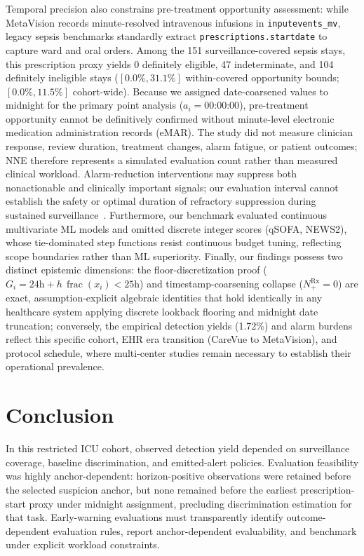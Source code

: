 \documentclass[12pt,a4paper]{article}
\begin{document}
Temporal precision also constrains pre-treatment opportunity assessment: while MetaVision records minute-resolved intravenous infusions in \texttt{inputevents\_mv}, legacy sepsis benchmarks standardly extract \texttt{prescriptions.startdate} to capture ward and oral orders. Among the 151 surveillance-covered sepsis stays, this prescription proxy yields 0 definitely eligible, 47 indeterminate, and 104 definitely ineligible stays ($[0.0\%, 31.1\%]$ within-covered opportunity bounds; $[0.0\%, 11.5\%]$ cohort-wide). Because we assigned date-coarsened values to midnight for the primary point analysis ($a_i = \text{00:00:00}$), pre-treatment opportunity cannot be definitively confirmed without minute-level electronic medication administration records (eMAR). The study did not measure clinician response, review duration, treatment changes, alarm fatigue, or patient outcomes; NNE therefore represents a simulated evaluation count rather than measured clinical workload. Alarm-reduction interventions may suppress both nonactionable and clinically important signals; our evaluation interval cannot establish the safety or optimal duration of refractory suppression during sustained surveillance~\cite{paine2016systematic}. Furthermore, our benchmark evaluated continuous multivariate ML models and omitted discrete integer scores (qSOFA, NEWS2), whose tie-dominated step functions resist continuous budget tuning, reflecting scope boundaries rather than ML superiority. Finally, our findings possess two distinct epistemic dimensions: the floor-discretization proof ($G_i = 24\mathrm{h} + h\,\operatorname{frac}(x_i) < 25\mathrm{h}$) and timestamp-coarsening collapse ($N_+^{\mathrm{Rx}} = 0$) are exact, assumption-explicit algebraic identities that hold identically in any healthcare system applying discrete lookback flooring and midnight date truncation; conversely, the empirical detection yields (1.72\%) and alarm burdens reflect this specific cohort, EHR era transition (CareVue to MetaVision), and protocol schedule, where multi-center studies remain necessary to establish their operational prevalence.

\section{Conclusion}
In this restricted ICU cohort, observed detection yield depended on surveillance coverage, baseline discrimination, and emitted-alert policies. Evaluation feasibility was highly anchor-dependent: horizon-positive observations were retained before the selected suspicion anchor, but none remained before the earliest prescription-start proxy under midnight assignment, precluding discrimination estimation for that task. Early-warning evaluations must transparently identify outcome-dependent evaluation rules, report anchor-dependent evaluability, and benchmark under explicit workload constraints.
\end{document}
